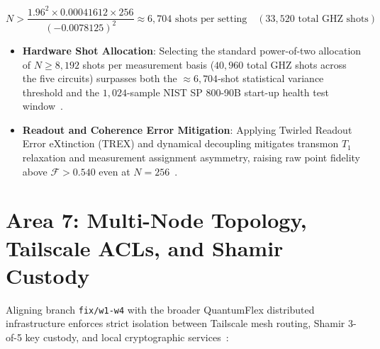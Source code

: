 \documentclass[10pt,letterpaper]{article}
\begin{document}
\begin{equation}
N > \frac{1.96^2 \times 0.00041612 \times 256}{(-0.0078125)^2} \approx 6{,}704\text{ shots per setting} \quad (33{,}520\text{ total GHZ shots})
\end{equation}

\begin{itemize}\setlength{\itemsep}{2pt}\setlength{\parskip}{0pt}
    \item \textbf{Hardware Shot Allocation}: Selecting the standard power-of-two allocation of $N \ge 8{,}192$ shots per measurement basis ($40{,}960$ total GHZ shots across the five circuits) surpasses both the $\approx 6{,}704$-shot statistical variance threshold and the $1{,}024$-sample NIST SP 800-90B start-up health test window~\cite{qfx_doc}.
    \item \textbf{Readout and Coherence Error Mitigation}: Applying Twirled Readout Error eXtinction (TREX) and dynamical decoupling mitigates transmon $T_1$ relaxation and measurement assignment asymmetry, raising raw point fidelity above $\mathcal{F} > 0.540$ even at $N = 256$~\cite{qfx_doc}.
\end{itemize}

\section{Area 7: Multi-Node Topology, Tailscale ACLs, and Shamir Custody}

Aligning branch \texttt{fix/w1-w4} with the broader QuantumFlex distributed infrastructure enforces strict isolation between Tailscale mesh routing, Shamir 3-of-5 key custody, and local cryptographic services~\cite{qfx_doc}:
\end{document}
